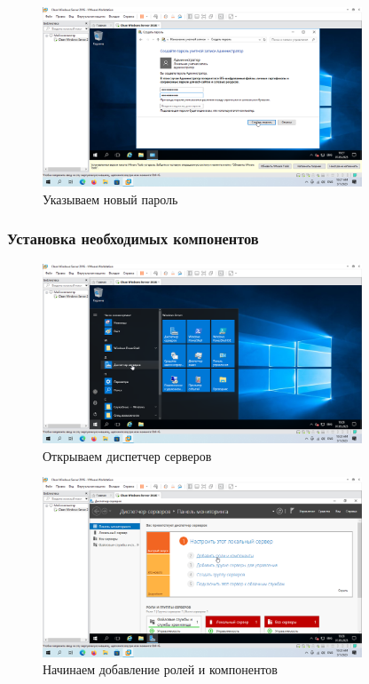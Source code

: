 \documentclass[a4paper]{article}
\begin{document}
  \begin{figure}[H]
    \centering
    \includegraphics[width=0.85\textwidth]{9_0030}
    \caption{Указываем новый пароль}
    \label{img:0030}
  \end{figure}

  \subsubsection{Установка необходимых компонентов}

  \begin{figure}[H]
    \centering
    \includegraphics[width=0.85\textwidth]{9_0031}
    \caption{Открываем диспетчер серверов}
    \label{img:0031}
  \end{figure}

  \begin{figure}[H]
    \centering
    \includegraphics[width=0.85\textwidth]{9_0032}
    \caption{Начинаем добавление ролей и компонентов}
    \label{img:0032}
  \end{figure}
\end{document}
